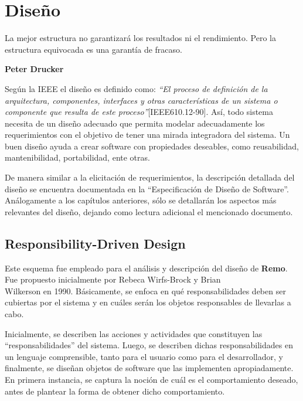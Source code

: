 \chapter{Diseño}
\label{disenio}

\epigraph{La mejor estructura no garantizará los
resultados ni el rendimiento. Pero la
estructura equivocada es una garantía de
fracaso.}%
{\textbf{Peter Drucker}}

\par Según la IEEE el diseño es definido como: \emph{``El proceso de definición de la arquitectura, componentes, interfaces y otras características de un sistema o componente que resulta de este proceso''}[IEEE610.12-90]. Así, todo sistema necesita de un diseño adecuado que permita modelar adecuadamente los requerimientos con el objetivo de tener una mirada integradora del sistema. Un buen diseño ayuda a crear software con propiedades deseables, como reusabilidad, mantenibilidad, portabilidad, ente otras.

\par De manera similar a la elicitación de requerimientos, la descripción detallada del diseño se encuentra documentada en la “Especificación de Diseño de Software”. Análogamente a los capítulos anteriores, sólo se detallarán los aspectos más relevantes del diseño, dejando como lectura adicional el mencionado documento.
 
\section{Responsibility-Driven Design}
\par Este esquema fue empleado para el análisis y descripción del diseño de \textbf{Remo}. Fue propuesto inicialmente por Rebeca Wirfs-Brock y Brian  \\
Wilkerson\cite{ResponsibilityDesign} en 1990. Básicamente, se enfoca en qué responsabilidades deben ser cubiertas por el sistema y en cuáles serán los objetos responsables de llevarlas a cabo. 

\par Inicialmente, se describen las acciones y actividades que constituyen las ``responsabilidades'' del sistema. Luego, se describen dichas responsabilidades en un lenguaje comprensible, tanto para el usuario como para el desarrollador, y finalmente, se diseñan objetos de software que las implementen apropiadamente. En primera instancia, se captura la noción de cuál es el comportamiento deseado, antes de plantear la forma de obtener dicho comportamiento.

